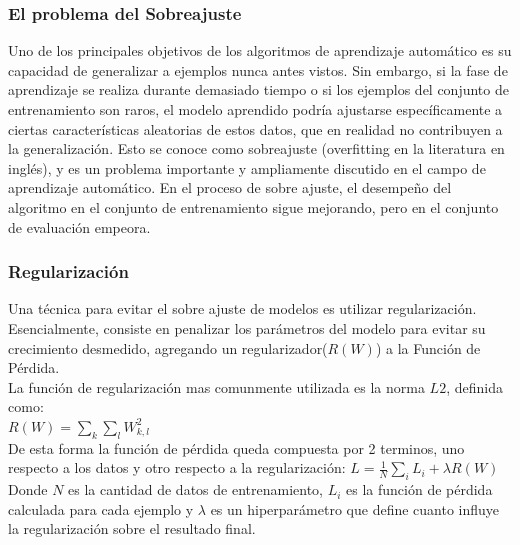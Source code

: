 \documentclass[a4paper,11pt,spanish]{book}
\begin{document}
	\subsubsection {El problema del Sobreajuste}
	  Uno de los principales objetivos de los algoritmos de aprendizaje automático es su capacidad de generalizar a ejemplos nunca antes vistos. Sin embargo, si la fase 
	  de aprendizaje se realiza durante demasiado tiempo o si los ejemplos del conjunto de entrenamiento son raros, el modelo aprendido podría ajustarse específicamente 
	  a ciertas características aleatorias de estos datos, que en realidad no contribuyen a la generalización. Esto se conoce como sobreajuste (overfitting en la literatura en inglés), 
	  y es un problema importante y ampliamente discutido en el campo de aprendizaje automático. En el proceso de sobre ajuste, el desempeño del algoritmo en el
	  conjunto de entrenamiento sigue mejorando, pero en el conjunto de evaluación empeora.
	  
	\subsubsection {Regularización}
	  Una técnica para evitar el sobre ajuste de modelos es utilizar regularización. Esencialmente, consiste en penalizar los parámetros del modelo para evitar su
	  crecimiento desmedido, agregando un regularizador($R(W)$) a la Función de Pérdida. \\
	  La función de regularización mas comunmente utilizada es la norma $L2$, definida como:\\
	   $R(W) = {\sum_{k} {\sum_{l}} W_{k,l}^2}$\\
	   De esta forma la función de pérdida queda compuesta por 2 terminos, uno respecto a los datos y otro respecto a la regularización:
	   $L = {\frac{1}{N}} {\sum_{i} L_{i}} + {\lambda R(W)}$ \\
	   Donde $N$ es la cantidad de datos de entrenamiento, $L_{i}$ es la función de pérdida calculada para cada ejemplo y ${\lambda}$ es un hiperparámetro que define 
	   cuanto influye la regularización sobre el resultado final. 
	   
\end{document}
